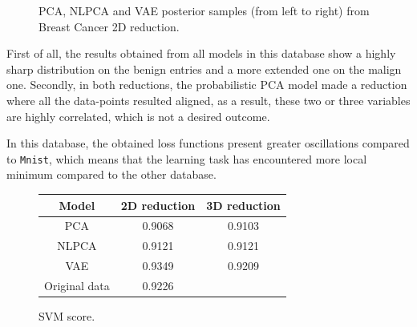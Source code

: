 \begin{figure}
  \centering
   \caption{PCA, NLPCA and VAE posterior samples (from left to right) from Breast Cancer 2D reduction.}\label{fig:breast_posterior_2D}
 \end{figure}

First of all, the results obtained from all models in this database show a highly sharp distribution on the benign entries and a more extended one on the malign one. Secondly, in both reductions, the probabilistic PCA model made a reduction where all the data-points resulted aligned, as a result, these two or three variables are highly correlated, which is not a desired outcome.

In this database, the obtained loss functions present greater oscillations compared to \texttt{Mnist}, which means that the learning task has encountered more local minimum compared to the other database.

\begin{figure}
  \centering
  \begin{tabular}{ccc}
    \hline
    Model    & 2D reduction & 3D reduction \\\hline
    PCA      & 0.9068 & 0.9103\\
    NLPCA    & 0.9121 & 0.9121\\
    VAE      & 0.9349 & 0.9209\\
    \hline
    \hline
    Original data & 0.9226 \\
    \hline
  \end{tabular}
  \caption{SVM score.}\label{tab:breast}
\end{figure}

